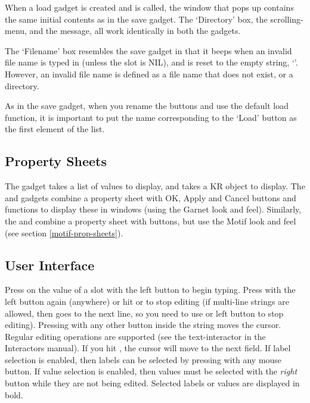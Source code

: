 When a load gadget is created and  is called,
the window that pops up contains the same initial contents as in the
save gadget.  The `Directory' box, the scrolling-menu, and the
message, all work identically in both the gadgets.

The `Filename' box resembles the save gadget in that it beeps when an
invalid file name is typed in (unless the  slot is
NIL), and is reset to the empty string, `'.  However, an invalid file
name is defined as a file name that does not exist, or a directory.

As in the save gadget, when you rename the buttons and use the default
load function, it is important to put the name corresponding to the
`Load' button as the first element of the  list.



\begin{group}
\section{Property Sheets}
\label{propertysheets}

The  gadget takes a list of values to display, and
 takes a KR object to display.  The
 and  gadgets
combine a property sheet with OK, Apply and Cancel buttons and
functions to display these in windows (using the Garnet look and
feel).  Similarly, the  and
 combine a property sheet with
buttons, but use the Motif look and feel (see section \ref{motif-prop-sheets}).
\end{group}

\begin{group}
\subsection{User Interface}

Press on the value of a slot with the left button to begin typing.  Press with
the left button again (anywhere) or hit  or 
to stop editing
(if multi-line
strings are allowed, then  goes to the next line, so you need to use
 or left button to stop editing).  Pressing with any other button
inside the string moves the cursor.  Regular editing operations are
supported (see the text-interactor in the Interactors manual).  If you
hit , the cursor will move to the next field.
If label selection is enabled, then labels can be selected by pressing
with any mouse button.  If value selection is enabled, then values must be
selected with the {\it right} button while they are not being edited.  Selected
labels or values are displayed in bold.
\end{group}

